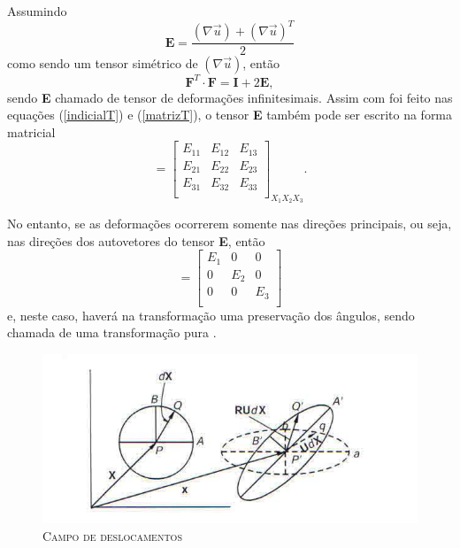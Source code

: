 Assumindo
\begin{equation}
	\textbf{E} = \dfrac{ ( { \nabla}  \vec{u}) + ( { \nabla}  \vec{u}) ^T}{2}
\end{equation}
como sendo um tensor simétrico de $ ( { \nabla}  \vec{u})   $, então
\begin{equation}
	\textbf{F} ^T \cdot \textbf{F} = \textbf{I} + 2 \textbf{E},
\end{equation}      
sendo \textbf{E} chamado de tensor de deformações infinitesimais.
Assim com foi feito nas equações (\ref{indicialT}) e (\ref{matrizT}), o tensor \textbf{E} também pode ser escrito na forma matricial
\begin{equation}
	[E] =  \left[ 
	\begin{array}{ccc}
		E_{11} & E_{12} & E_{13} \\
		E_{21} & E_{22} & E_{23} \\
		E_{31} & E_{32} & E_{33} \\
	\end{array}
	\right] _{X_{1} X_{2} X_{3}}.  
\end{equation}

No entanto, se as deformações ocorrerem somente nas direções principais, ou seja, nas direções dos autovetores  do tensor \textbf{E}, então
\begin{equation}
	[E] =  \left[ 
	\begin{array}{ccc}
		E_{1} & 0 & 0 \\
		0 & E_{2} & 0 \\
		0 & 0 & E_{3} \\
	\end{array}
	\right]  
\end{equation}
e, neste caso, haverá na transformação uma preservação dos ângulos, sendo chamada de uma transformação pura \cite{Lai}.

\begin{figure}[H]
	\centering
	\includegraphics[scale=1]{figuras/deformacoes.jpg}
	\caption{\textsc{Campo de deslocamentos}}
	\vspace{-0.1cm}
	\label{fig:campodesl}
\end{figure}

